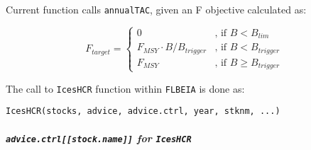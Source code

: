   Current function calls \texttt{annualTAC}, given an F objective calculated as:

  \begin{equation}
  	F_{target} = 
  	\begin{cases}
				0                       & \text{, if } B < B_{lim}\\
				F_{MSY} \cdot B/B_{trigger} & \text{, if } B < B_{trigger}\\
				F_{MSY}                 & \text{, if } B \geq B_{trigger}
  	\end{cases}
  \end{equation}

  The call to \texttt{IcesHCR} function within \texttt{FLBEIA} is done as:
	\begin{center}
		\texttt{IcesHCR(stocks, advice, advice.ctrl, year, stknm, ...)}
	\end{center}
	
	\subparagraph{\texttt{advice.ctrl[[stock.name]]} for \texttt{IcesHCR}}


